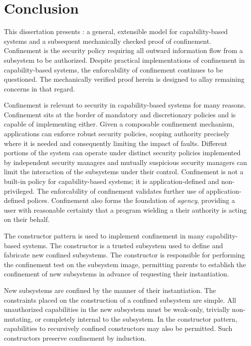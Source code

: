 \chapter{Conclusion}
\label{ch:conclusion}
\label{ch:review}

This dissertation presents \TMmodelName{}: a general, extensible model for capability-based systems and a subsequent mechanically checked proof of confinement.
Confinement is the security policy requiring all outward information flow from a subsystem to be authorized.
Despite practical implementations of confinement in capability-based systems, the enforcability of confinement continues to be questioned.
The mechanically verified proof herein is designed to allay remaining concerns in that regard.

Confinement is relevant to security in capability-based systems for many reasons.
Confinement sits at the border of mandatory and discretionary policies and is capable of implementing either.
Given a composable confinement mechanism, applications can enforce robust security policies, scoping authority precisely where it is needed and consequently limiting the impact of faults.
Different portions of the system can operate under distinct security policies implemented by independent security managers and mutually suspicious security managers can limit the interaction of the subsystems under their control.
Confinement is not a built-in policy for capability-based systems; it is application-defined and non-privileged.
The enforcability of confinement validates further use of application-defined polices.
Confinement also forms the foundation of \emph{agency}, providing a user with reasonable certainty that a program wielding a their authority is acting on their behalf.

The constructor pattern is used to implement confinement in many capability-based systems.
The constructor is a trusted subsystem used to define and fabricate new confined subsystems.
The constructor is responsible for performing the confinement test on the subsystem image, permitting parents to establish the confinement of new subsystems in advance of requesting their instantiation.

New subsystems are confined by the manner of their instantiation.
The constraints placed on the construction of a confined subsystem are simple.
All unauthorized capabilities in the new subsystem must be weak-only, trivially non-mutating, or completely internal to the subsystem.
In the constructor pattern, capabilities to recursively confined constructors may also be permitted.
Such constructors preserve confinement by induction.

